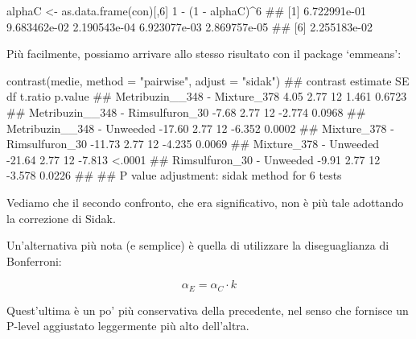 \documentclass[a4paper,12pt,oneside]{book}
\newenvironment{Shaded}{\begin{snugshade}}{\end{snugshade}}
\newcommand{\DecValTok}[1]{#1}
\newcommand{\SpecialCharTok}[1]{#1}
\newcommand{\StringTok}[1]{#1}
\newcommand{\DocumentationTok}[1]{#1}
\newcommand{\OtherTok}[1]{#1}
\newcommand{\FunctionTok}[1]{#1}
\newcommand{\AttributeTok}[1]{#1}
\newcommand{\NormalTok}[1]{#1}
\begin{document}
\scriptsize

\begin{Shaded}
\begin{Highlighting}[]
\NormalTok{alphaC }\OtherTok{\textless{}{-}} \FunctionTok{as.data.frame}\NormalTok{(con)[,}\DecValTok{6}\NormalTok{]}
\DecValTok{1} \SpecialCharTok{{-}}\NormalTok{ (}\DecValTok{1} \SpecialCharTok{{-}}\NormalTok{ alphaC)}\SpecialCharTok{\^{}}\DecValTok{6}
\DocumentationTok{\#\# [1] 6.722991e{-}01 9.683462e{-}02 2.190543e{-}04 6.923077e{-}03 2.869757e{-}05}
\DocumentationTok{\#\# [6] 2.255183e{-}02}
\end{Highlighting}
\end{Shaded}

\normalsize

Più facilmente, possiamo arrivare allo stesso risultato con il package `emmeans':

\scriptsize

\begin{Shaded}
\begin{Highlighting}[]
\FunctionTok{contrast}\NormalTok{(medie, }\AttributeTok{method =} \StringTok{"pairwise"}\NormalTok{, }\AttributeTok{adjust =} \StringTok{"sidak"}\NormalTok{)}
\DocumentationTok{\#\#  contrast                         estimate   SE df t.ratio p.value}
\DocumentationTok{\#\#  Metribuzin\_\_348 {-} Mixture\_378        4.05 2.77 12   1.461  0.6723}
\DocumentationTok{\#\#  Metribuzin\_\_348 {-} Rimsulfuron\_30    {-}7.68 2.77 12  {-}2.774  0.0968}
\DocumentationTok{\#\#  Metribuzin\_\_348 {-} Unweeded         {-}17.60 2.77 12  {-}6.352  0.0002}
\DocumentationTok{\#\#  Mixture\_378 {-} Rimsulfuron\_30       {-}11.73 2.77 12  {-}4.235  0.0069}
\DocumentationTok{\#\#  Mixture\_378 {-} Unweeded             {-}21.64 2.77 12  {-}7.813  \textless{}.0001}
\DocumentationTok{\#\#  Rimsulfuron\_30 {-} Unweeded           {-}9.91 2.77 12  {-}3.578  0.0226}
\DocumentationTok{\#\# }
\DocumentationTok{\#\# P value adjustment: sidak method for 6 tests}
\end{Highlighting}
\end{Shaded}

\normalsize

Vediamo che il secondo confronto, che era significativo, non è più tale adottando la correzione di Sidak.

Un'alternativa più nota (e semplice) è quella di utilizzare la diseguaglianza di Bonferroni:

\[\alpha_E = \alpha_C \cdot k\]

Quest'ultima è un po' più conservativa della precedente, nel senso che fornisce un P-level aggiustato leggermente più alto dell'altra.
\end{document}

